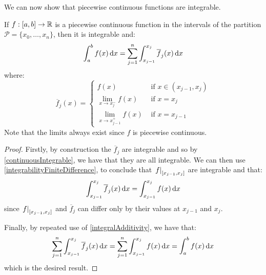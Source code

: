 \documentclass[../main.tex]{subfiles}
\begin{document}
We can now show that piecewise continuous functions are integrable.
\begin{proposition}
  If $f: [a, b] \to \mathbb{R}$ is a piecewise continuous function in the intervals of the partition $\mathcal{P} = \{x_0, \ldots, x_n\}$, then it is integrable and: \label{piecewiseIntegrable}
  \[
    \int_{a}^{b} f(x) \d{x} = \sum_{j = 1}^{n} \int_{x_{j - 1}}^{x_j} \overline{f}_j(x)  \d{x}
  \]
  where:
  \[
    \overline{f}_j(x) = \begin{cases}
    f(x) & \text{ if } x \in (x_{j - 1}, x_j) \\
    \lim_{x \to x_j^-} f(x) & \text{ if } x = x_j  \\
    \lim_{x \to x_{j - 1}^{+}} f(x) & \text{ if } x=x_{j - 1}
    \end{cases}
  \]
  Note that the limits always exist since $f$ is piecewise continuous.
\end{proposition}
\begin{proof}
  Firstly, by construction the $\overline{f}_j$ are integrable and so by \cref{continuousIntegrable}, we have that they are all integrable.
  We can then use \cref{integrabilityFiniteDifference}, to conclude that $\left. f \right|_{[x_{j - 1}, x_j]}$ are integrable and that:
  \[
    \int_{x_{j - 1}}^{x_j} \overline{f}_j(x) \d{x} = \int_{x_{j - 1}}^{x_j} f(x) \d{x}
  \]
  since $\left. f \right|_{[x_{j - 1}, x_j]}$ and $\overline{f}_j$ can differ only by their values at $x_{j - 1}$ and $x_j$.

  Finally, by repeated use of \cref{integralAdditivity}, we have that:
  \[
    \sum_{j = 1}^{n} \int_{x_{j - 1}}^{x_j} \overline{f}_j(x) \d{x} = \sum_{j = 1}^{n} \int_{x_{j - 1}}^{x_j} f(x) \d{x} = \int_{a}^{b} f(x) \d{x}
  \]
  which is the desired result.
\end{proof}
\end{document}
